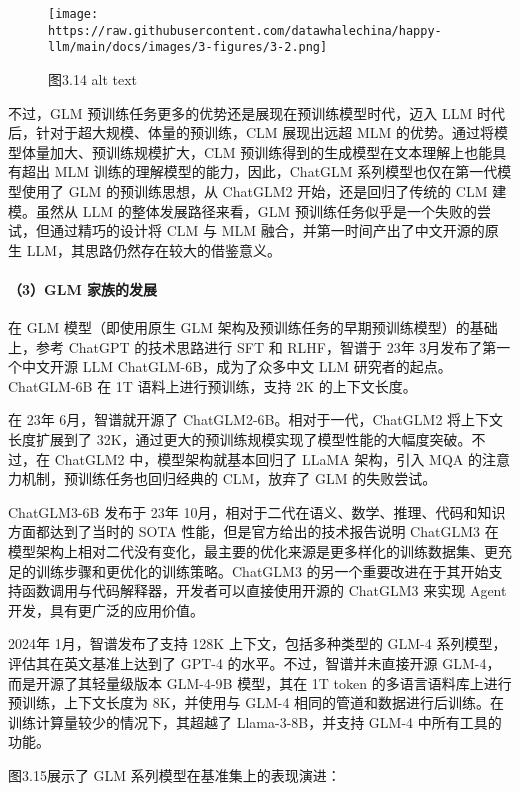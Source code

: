 \documentclass[
]{article}
\begin{document}
\begin{figure}[htbp]\centering
\texttt{[image: https://raw.githubusercontent.com/datawhalechina/happy-llm/main/docs/images/3-figures/3-2.png]}
\caption{图3.14 alt text}
\end{figure}

不过，GLM 预训练任务更多的优势还是展现在预训练模型时代，迈入 LLM
时代后，针对于超大规模、体量的预训练，CLM 展现出远超 MLM
的优势。通过将模型体量加大、预训练规模扩大，CLM
预训练得到的生成模型在文本理解上也能具有超出 MLM
训练的理解模型的能力，因此，ChatGLM 系列模型也仅在第一代模型使用了 GLM
的预训练思想，从 ChatGLM2 开始，还是回归了传统的 CLM 建模。虽然从 LLM
的整体发展路径来看，GLM
预训练任务似乎是一个失败的尝试，但通过精巧的设计将 CLM 与 MLM
融合，并第一时间产出了中文开源的原生 LLM，其思路仍然存在较大的借鉴意义。

\paragraph{（3）GLM
家族的发展}\label{glm-ux5bb6ux65cfux7684ux53d1ux5c55}

在 GLM 模型（即使用原生 GLM
架构及预训练任务的早期预训练模型）的基础上，参考 ChatGPT 的技术思路进行
SFT 和 RLHF，智谱于 23年 3月发布了第一个中文开源 LLM
ChatGLM-6B，成为了众多中文 LLM 研究者的起点。ChatGLM-6B 在 1T
语料上进行预训练，支持 2K 的上下文长度。

在 23年 6月，智谱就开源了 ChatGLM2-6B。相对于一代，ChatGLM2
将上下文长度扩展到了
32K，通过更大的预训练规模实现了模型性能的大幅度突破。不过，在 ChatGLM2
中，模型架构就基本回归了 LLaMA 架构，引入 MQA
的注意力机制，预训练任务也回归经典的 CLM，放弃了 GLM 的失败尝试。

ChatGLM3-6B 发布于 23年
10月，相对于二代在语义、数学、推理、代码和知识方面都达到了当时的 SOTA
性能，但是官方给出的技术报告说明 ChatGLM3
在模型架构上相对二代没有变化，最主要的优化来源是更多样化的训练数据集、更充足的训练步骤和更优化的训练策略。ChatGLM3
的另一个重要改进在于其开始支持函数调用与代码解释器，开发者可以直接使用开源的
ChatGLM3 来实现 Agent 开发，具有更广泛的应用价值。

2024年 1月，智谱发布了支持 128K 上下文，包括多种类型的 GLM-4
系列模型，评估其在英文基准上达到了 GPT-4 的水平。不过，智谱并未直接开源
GLM-4，而是开源了其轻量级版本 GLM-4-9B 模型，其在 1T token
的多语言语料库上进行预训练，上下文长度为 8K，并使用与 GLM-4
相同的管道和数据进行后训练。在训练计算量较少的情况下，其超越了
Llama-3-8B，并支持 GLM-4 中所有工具的功能。

图3.15展示了 GLM 系列模型在基准集上的表现演进：
\end{document}
